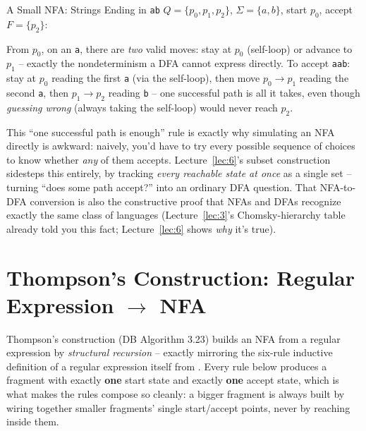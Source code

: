 \documentclass[full-course-notes.tex]{subfiles}
\begin{document}
\begin{examplebox}{A Small NFA: Strings Ending in \texttt{ab}}
$Q = \{p_0, p_1, p_2\}$, $\Sigma = \{a,b\}$, start $p_0$, accept $F = \{p_2\}$:
\begin{center}
\end{center}
From $p_0$, on an \texttt{a}, there are \emph{two} valid moves: stay at $p_0$ (self-loop) or
advance to $p_1$ -- exactly the nondeterminism a DFA cannot express directly. To accept
\texttt{aab}: stay at $p_0$ reading the first \texttt{a} (via the self-loop), then move
$p_0\to p_1$ reading the second \texttt{a}, then $p_1 \to p_2$ reading \texttt{b} -- one
successful path is all it takes, even though \emph{guessing wrong} (always taking the self-loop)
would never reach $p_2$.
\end{examplebox}

\begin{examfocus}
This ``one successful path is enough'' rule is exactly why simulating an NFA directly is
awkward: naively, you'd have to try every possible sequence of choices to know whether
\emph{any} of them accepts. Lecture~\ref{lec:6}'s subset construction sidesteps this entirely,
by tracking \emph{every reachable state at once} as a single set -- turning ``does some path
accept?'' into an ordinary DFA question. That NFA-to-DFA conversion is also the constructive
proof that NFAs and DFAs recognize exactly the same class of languages (Lecture~\ref{lec:3}'s
Chomsky-hierarchy table already told you this fact; Lecture~\ref{lec:6} shows \emph{why} it's
true).
\end{examfocus}

\section{Thompson's Construction: Regular Expression $\to$ NFA}
\label{sec:l5-thompson}

\dbtag Thompson's construction (DB Algorithm 3.23) builds an NFA from a regular expression by
\emph{structural recursion} -- exactly mirroring the six-rule inductive definition of a regular
expression itself from . Every rule below produces a fragment
with exactly \textbf{one} start state and exactly \textbf{one} accept state, which is what
makes the rules compose so cleanly: a bigger fragment is always built by wiring together
smaller fragments' single start/accept points, never by reaching inside them.
\end{document}
